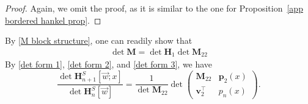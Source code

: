 \documentclass[a4paper,10pt,leqno]{amsart}
\numberwithin{equation}{section}
\theoremstyle{remark}
\begin{document}
\begin{proof}
Again, we omit the proof, as it is similar to the one for Proposition~\ref{app bordered hankel prop}.
\end{proof}


By \eqref{M block structure}, one can readily show that
\begin{align} \label{det form 3}
\det \bm{M} = \det \bm{H}_1 \det \bm{M}_{22}
\end{align}
By \eqref{det form 1}, \eqref{det form 2}, and \eqref{det form 3}, we have
\[
\frac{\det \bm{H}^{S}_{n+1}[\vec{w}; x]}{\det \bm{H}^{S}_{n}[\vec{w}]} = \frac{1}{\det \bm{M}_{22}} \det
\begin{pmatrix}
\bm{M}_{22}  & \bm{p}_2(x)  \\
\bm{v}_2^\top & p_n(x)
\end{pmatrix}.
\]



 




\end{document}
